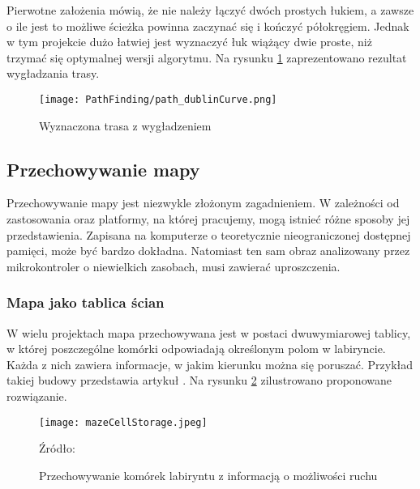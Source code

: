         Pierwotne założenia mówią, że nie należy łączyć dwóch prostych łukiem, a zawsze o ile jest to możliwe ścieżka powinna zaczynać się i kończyć półokręgiem.
        Jednak w tym projekcie dużo łatwiej jest wyznaczyć łuk wiążący dwie proste, niż trzymać się optymalnej wersji algorytmu.
        Na rysunku \ref{fig:path_dublin} zaprezentowano rezultat wygładzania trasy.

        \begin{figure}[!ht]
            \centering
            \texttt{[image: PathFinding/path\_dublinCurve.png]}
            \caption{Wyznaczona trasa z wygładzeniem}
            \label{fig:path_dublin}
        \end{figure}



    \subsection{Przechowywanie mapy}
    \label{subsec:przechowywanie_mapy}
        Przechowywanie mapy jest niezwykle złożonym zagadnieniem.
        W zależności od zastosowania oraz platformy, na której pracujemy, mogą istnieć różne sposoby jej przedstawienia.
        Zapisana na komputerze o teoretycznie nieograniczonej dostępnej pamięci, może być bardzo dokładna.
        Natomiast ten sam obraz analizowany przez mikrokontroler o niewielkich zasobach, musi zawierać uproszczenia.

        \subsubsection{Mapa jako tablica ścian}
            W wielu projektach mapa przechowywana jest w postaci dwuwymiarowej tablicy, w której poszczególne komórki odpowiadają określonym polom w labiryncie.
            Każda z nich zawiera informacje, w jakim kierunku można się poruszać.
            Przykład takiej budowy przedstawia artykuł \cite{maze_storage}.
            Na rysunku \ref{fig:mazeCellStorage} zilustrowano proponowane rozwiązanie.

            \begin{figure}[!ht]
                \centering
                \texttt{[image: mazeCellStorage.jpeg]}
                \caption{Przechowywanie komórek labiryntu z informacją o możliwości ruchu}
                Źródło: \cite{maze_storage}
                \label{fig:mazeCellStorage}
            \end{figure}

